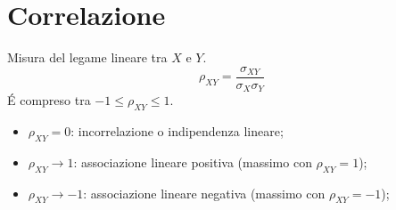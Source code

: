 \section{Correlazione}
Misura del legame lineare tra $X$ e $Y$.
\[ \rho_{XY} = \frac{\sigma_{XY}}{\sigma_X \sigma_Y}\]
\'E compreso tra $-1 \le \rho_{XY} \le 1$.
\begin{itemize}
 \item $\rho_{XY} = 0$: incorrelazione o indipendenza lineare;
 \item $\rho_{XY} \rightarrow 1$: associazione lineare positiva (massimo 
con $\rho_{XY} = 1$);
\item $\rho_{XY} \rightarrow -1$: associazione lineare negativa (massimo 
con $\rho_{XY} = -1$);
\end{itemize}
